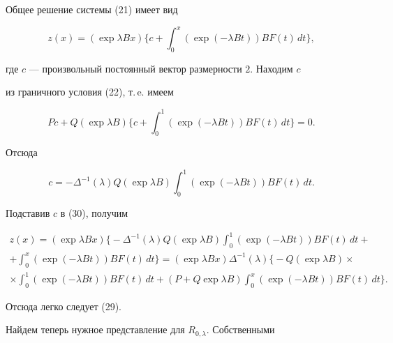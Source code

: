 \begin{pf}


Общее решение системы (21) имеет вид


\begin{equation}


z(x)=(\exp\lambda Bx)\bigg\{ c+\int_0^x(\exp(-\lambda Bt))BF(t)\,


dt\bigg\},


\end{equation}


где $c$ --- произвольный постоянный вектор размерности $2$. Находим $c$


из граничного условия (22), т.\,e. имеем


$$


Pc+Q(\exp\lambda B) \bigg\{ c+\int_0^1(\exp(-\lambda Bt))BF(t)\,


dt\bigg\}=0.


$$


Отсюда


$$


c=-\Delta^{-1}(\lambda)Q(\exp\lambda B)\int_0^1(\exp(-\lambda Bt))


BF(t)\, dt.


$$


Подставив $c$ в (30), получим


\begin{multline*}


z(x)=(\exp\lambda Bx)\bigg\{-\Delta^{-1}(\lambda)Q(\exp\lambda B)


\int_0^1(\exp(-\lambda Bt))BF(t)\, dt+ \\


%


+\int_0^x(\exp(-\lambda Bt))BF(t)\, dt\bigg\}=


(\exp\lambda Bx)\Delta^{-1}(\lambda)\bigg\{-Q(\exp\lambda B)\times \\


%


\times\int_0^1(\exp(-\lambda Bt))BF(t)\, dt+


(P+Q\exp\lambda B)\int_0^x(\exp(-\lambda Bt))BF(t)\, dt\bigg\}.


\end{multline*}


Отсюда легко следует (29).


\end{pf}





Найдем теперь нужное представление для $R_{0,\lambda}$. Собственными


